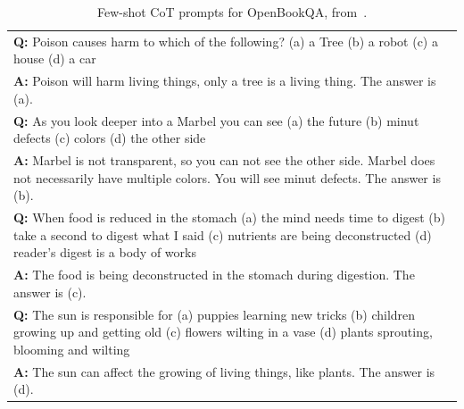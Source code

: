 \begin{table}[h]
    \caption{
    Few-shot CoT prompts for OpenBookQA, from~\cite{Wang2022RationaleAugmentedEI}.
    }
    \centering
    \small
    \begin{tabular}{p{14cm}}
        \toprule
        \textbf{Q:} Poison causes harm to which of the following? (a) a Tree (b) a robot (c) a house (d) a car\\
        \vspace{-1mm}
        \textbf{A:} Poison will harm living things, only a tree is a living thing. The answer is (a).\\
        \vspace{0mm}
        \textbf{Q:} As you look deeper into a Marbel you can see (a) the future (b) minut defects (c) colors (d) the other side\\
        \vspace{-1mm}
        \textbf{A:} Marbel is not transparent, so you can not see the other side. Marbel does not necessarily have multiple colors. You will see minut defects. The answer is (b). \\
        \vspace{0mm}
        \textbf{Q:} When food is reduced in the stomach (a) the mind needs time to digest (b) take a second to digest what I said (c) nutrients are being deconstructed (d) reader's digest is a body of works\\
        \vspace{-1mm}
        \textbf{A:} The food is being deconstructed in the stomach during digestion. The answer is (c).\\
        \vspace{0mm}
        \textbf{Q:} The sun is responsible for (a) puppies learning new tricks (b) children growing up and getting old (c) flowers wilting in a vase (d) plants sprouting, blooming and wilting\\
        \vspace{-1mm}
        \textbf{A:} The sun can affect the growing of living things, like plants. The answer is (d).\\
        \bottomrule
    \end{tabular}
    \label{tab:prompt-obqa}
\end{table}

